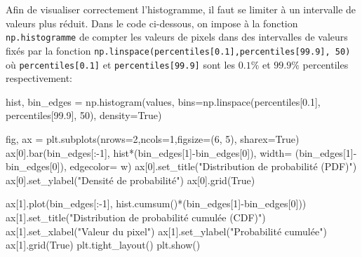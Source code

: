 \documentclass[
  11pt,
  letterpaper,
  open=any,
  twoside=false,
  french]{scrbook}
\newenvironment{Shaded}{\begin{snugshade}}{\end{snugshade}}
\newcommand{\DecValTok}[1]{\textcolor[rgb]{0.68,0.00,0.00}{#1}}
\newcommand{\FloatTok}[1]{\textcolor[rgb]{0.68,0.00,0.00}{#1}}
\newcommand{\NormalTok}[1]{\textcolor[rgb]{0.00,0.23,0.31}{#1}}
\newcommand{\OperatorTok}[1]{\textcolor[rgb]{0.37,0.37,0.37}{#1}}
\newcommand{\StringTok}[1]{\textcolor[rgb]{0.13,0.47,0.30}{#1}}
\newcommand{\VariableTok}[1]{\textcolor[rgb]{0.07,0.07,0.07}{#1}}
\begin{document}
Afin de visualiser correctement l'histogramme, il faut se limiter à un
intervalle de valeurs plus réduit. Dans le code ci-dessous, on impose à
la fonction \texttt{np.histogramme} de compter les valeurs de pixels
dans des intervalles de valeurs fixés par la fonction
\texttt{np.linspace(percentiles{[}0.1{]},percentiles{[}99.9{]},\ 50)} où
\texttt{percentiles{[}0.1{]}} et \texttt{percentiles{[}99.9{]}} sont les
\(0.1\%\) et \(99.9\%\) percentiles respectivement:

\begin{Shaded}
\begin{Highlighting}[]
\NormalTok{hist, bin\_edges }\OperatorTok{=}\NormalTok{ np.histogram(values, }
\NormalTok{                                bins}\OperatorTok{=}\NormalTok{np.linspace(percentiles[}\FloatTok{0.1}\NormalTok{], }
\NormalTok{                                percentiles[}\FloatTok{99.9}\NormalTok{], }\DecValTok{50}\NormalTok{), }
\NormalTok{                                density}\OperatorTok{=}\VariableTok{True}\NormalTok{)}

\NormalTok{fig, ax }\OperatorTok{=}\NormalTok{ plt.subplots(nrows}\OperatorTok{=}\DecValTok{2}\NormalTok{,ncols}\OperatorTok{=}\DecValTok{1}\NormalTok{,figsize}\OperatorTok{=}\NormalTok{(}\DecValTok{6}\NormalTok{, }\DecValTok{5}\NormalTok{), sharex}\OperatorTok{=}\VariableTok{True}\NormalTok{)}
\NormalTok{ax[}\DecValTok{0}\NormalTok{].bar(bin\_edges[:}\OperatorTok{{-}}\DecValTok{1}\NormalTok{], }
\NormalTok{                hist}\OperatorTok{*}\NormalTok{(bin\_edges[}\DecValTok{1}\NormalTok{]}\OperatorTok{{-}}\NormalTok{bin\_edges[}\DecValTok{0}\NormalTok{]), }
\NormalTok{                width}\OperatorTok{=}\NormalTok{ (bin\_edges[}\DecValTok{1}\NormalTok{]}\OperatorTok{{-}}\NormalTok{bin\_edges[}\DecValTok{0}\NormalTok{]), }
\NormalTok{                edgecolor}\OperatorTok{=} \StringTok{\textquotesingle{}w\textquotesingle{}}\NormalTok{)}
\NormalTok{ax[}\DecValTok{0}\NormalTok{].set\_title(}\StringTok{"Distribution de probabilité (PDF)"}\NormalTok{)}
\NormalTok{ax[}\DecValTok{0}\NormalTok{].set\_ylabel(}\StringTok{"Densité de probabilité"}\NormalTok{)}
\NormalTok{ax[}\DecValTok{0}\NormalTok{].grid(}\VariableTok{True}\NormalTok{)}

\NormalTok{ax[}\DecValTok{1}\NormalTok{].plot(bin\_edges[:}\OperatorTok{{-}}\DecValTok{1}\NormalTok{], }
\NormalTok{            hist.cumsum()}\OperatorTok{*}\NormalTok{(bin\_edges[}\DecValTok{1}\NormalTok{]}\OperatorTok{{-}}\NormalTok{bin\_edges[}\DecValTok{0}\NormalTok{]))}
\NormalTok{ax[}\DecValTok{1}\NormalTok{].set\_title(}\StringTok{"Distribution de probabilité cumulée (CDF)"}\NormalTok{)}
\NormalTok{ax[}\DecValTok{1}\NormalTok{].set\_xlabel(}\StringTok{"Valeur du pixel"}\NormalTok{)}
\NormalTok{ax[}\DecValTok{1}\NormalTok{].set\_ylabel(}\StringTok{"Probabilité cumulée"}\NormalTok{)}
\NormalTok{ax[}\DecValTok{1}\NormalTok{].grid(}\VariableTok{True}\NormalTok{)}
\NormalTok{plt.tight\_layout()}
\NormalTok{plt.show()                              }
\end{Highlighting}
\end{Shaded}
\end{document}
